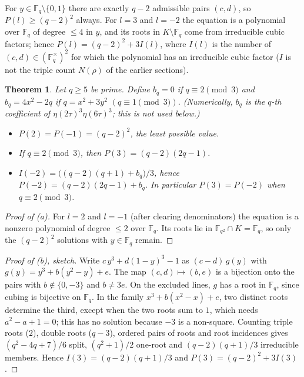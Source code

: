 \documentclass[11pt]{article}
\newtheorem{theorem}{Theorem}
\begin{document}
For $y\in\mathbb F_q\setminus\{0,1\}$ there are exactly $q-2$ admissible pairs $(c,d)$, so $P(l)\ge(q-2)^2$ always. For $l=3$ and $l=-2$
the equation is a polynomial over $\mathbb F_q$ of degree $\le4$ in $y$, and its roots in $K\setminus\mathbb F_q$ come from irreducible cubic factors; hence
$P(l)=(q-2)^2+3I(l)$, where $I(l)$ is the number of $(c,d)\in(\mathbb F_q^\times)^2$ for which the polynomial has an irreducible cubic factor
($I$ is not the triple count $N(\rho)$ of the earlier sections).

\begin{theorem}\label{thm:gal}
Let $q\ge5$ be prime. Define $b_q=0$ if $q\equiv2\pmod3$ and $b_q=4x^2-2q$ if $q=x^2+3y^2$ $(q\equiv1\pmod3)$.
(Numerically, $b_q$ is the $q$-th coefficient of $\eta(2\tau)^3\eta(6\tau)^3$; this is not used below.)
\begin{itemize}
\item[(a)] $P(2)=P(-1)=(q-2)^2$, the least possible value.
\item[(b)] If $q\equiv2\pmod3$, then $P(3)=(q-2)(2q-1)$.
\item[(c)] $I(-2)=\big((q-2)(q+1)+b_q\big)/3$, hence $P(-2)=(q-2)(2q-1)+b_q$. In particular $P(3)=P(-2)$ when $q\equiv2\pmod3$.
\end{itemize}
\end{theorem}

\begin{proof}[Proof of (a)]
For $l=2$ and $l=-1$ (after clearing denominators) the equation is a nonzero polynomial of degree $\le2$ over $\mathbb F_q$. Its roots lie in
$\mathbb F_{q^2}\cap K=\mathbb F_q$, so only the $(q-2)^2$ solutions with $y\in\mathbb F_q$ remain.
\end{proof}

\begin{proof}[Proof of (b), sketch]
Write $c\,y^3+d(1-y)^3-1$ as $(c-d)\,g(y)$ with $g(y)=y^3+b(y^2-y)+e$. The map $(c,d)\mapsto(b,e)$ is a bijection onto the pairs with
$b\notin\{0,-3\}$ and $b\ne3e$. On the excluded lines, $g$ has a root in $\mathbb F_q$, since cubing is bijective on $\mathbb F_q$. In the family
$x^3+b(x^2-x)+e$, two distinct roots determine the third, except when the two roots sum to $1$, which needs $a^2-a+1=0$; this has no solution because
$-3$ is a non-square. Counting triple roots ($2$), double roots ($q-3$), ordered pairs of roots and root incidences gives
$(q^2-4q+7)/6$ split, $(q^2+1)/2$ one-root and $(q-2)(q+1)/3$ irreducible members. Hence $I(3)=(q-2)(q+1)/3$ and $P(3)=(q-2)^2+3I(3)$.
\end{proof}
\end{document}
